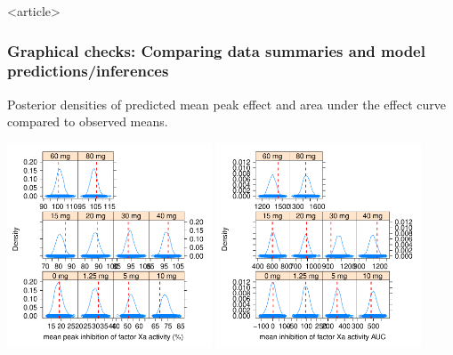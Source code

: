 \documentclass{beamer}
\begin{document}
\begin{frame}<article>
  \frametitle{Graphical checks: Comparing data summaries and model predictions/inferences}
  
    Posterior densities of predicted mean peak effect and area under
    the effect curve compared to observed means.
\vspace{-0.25in}
  \begin{center}
    \includegraphics[width=2.4in,trim=0.2in 0 0
    0,clip]{graphics/me2HandsOn2Plots025.pdf}
    \includegraphics[width=2.4in,trim=0.2in 0 0
    0,clip]{graphics/me2HandsOn2Plots026.pdf}
  \end{center}

\end{frame}
\end{document}
